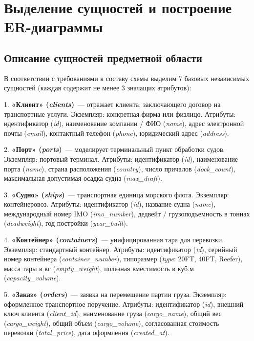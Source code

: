 \documentclass[a4paper,14pt]{article}
\begin{document}
\newpage
\section{Выделение сущностей и построение ER-диаграммы}

\subsection{Описание сущностей предметной области}
В соответствии с требованиями к составу схемы выделим 7 базовых независимых сущностей (каждая содержит не менее 3 значащих атрибутов):

1. \textbf{«Клиент» (\textit{clients})}~--- отражает клиента, заключающего договор на транспортные услуги. Экземпляр: конкретная фирма или физлицо. Атрибуты: идентификатор (\textit{id}), наименование компании / ФИО (\textit{name}), адрес электронной почты (\textit{email}), контактный телефон (\textit{phone}), юридический адрес (\textit{address}).

2. \textbf{«Порт» (\textit{ports})}~--- моделирует терминальный пункт обработки судов. Экземпляр: портовый терминал. Атрибуты: идентификатор (\textit{id}), наименование порта (\textit{name}), страна расположения (\textit{country}), число причалов (\textit{dock\_count}), максимальная допустимая осадка судна (\textit{max\_draft}).

3. \textbf{«Судно» (\textit{ships})}~--- транспортная единица морского флота. Экземпляр: контейнеровоз. Атрибуты: идентификатор (\textit{id}), название судна (\textit{name}), международный номер IMO (\textit{imo\_number}), дедвейт / грузоподъемность в тоннах (\textit{deadweight}), год постройки (\textit{year\_built}).

4. \textbf{«Контейнер» (\textit{containers})}~--- унифицированная тара для перевозки. Экземпляр: стандартный контейнер. Атрибуты: идентификатор (\textit{id}), серийный номер контейнера (\textit{container\_number}), типоразмер (\textit{type}: 20FT, 40FT, Reefer), масса тары в кг (\textit{empty\_weight}), полезная вместимость в куб.м (\textit{capacity\_volume}).

5. \textbf{«Заказ» (\textit{orders})}~--- заявка на перемещение партии груза. Экземпляр: оформленное транспортное поручение. Атрибуты: идентификатор (\textit{id}), внешний ключ клиента (\textit{client\_id}), наименование груза (\textit{cargo\_name}), общий вес (\textit{cargo\_weight}), общий объем (\textit{cargo\_volume}), согласованная стоимость перевозки (\textit{total\_price}), дата оформления (\textit{created\_at}).
\end{document}

